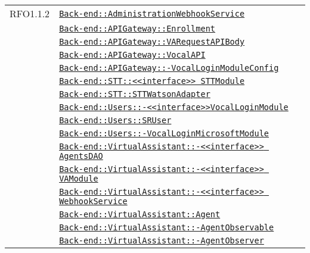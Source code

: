 \begin{longtable}{|>{\centering}m{3cm}|m{10cm}<{\centering}|}
RFO1.1.2 & \hyperref[Back-end::AdministrationWebhookService]{\texttt{Back-end::AdministrationWebhookService}}\\
& \hyperref[Back-end::APIGateway::Enrollment]{\texttt{Back-end::APIGateway::Enrollment}}\\
& \hyperref[Back-end::APIGateway::VARequestAPIBody]{\texttt{Back-end::APIGateway::VARequestAPIBody}}\\
& \hyperref[Back-end::APIGateway::VocalAPI]{\texttt{Back-end::APIGateway::VocalAPI}}\\
& \hyperref[Back-end::APIGateway::VocalLoginModuleConfig]{\texttt{Back-end::APIGateway::-\linebreak VocalLoginModuleConfig}}\\
& \hyperref[Back-end::STT::<<interface>> STTModule]{\texttt{Back-end::STT::<<interface>> STTModule}}\\
& \hyperref[Back-end::STT::STTWatsonAdapter]{\texttt{Back-end::STT::STTWatsonAdapter}}\\
& \hyperref[Back-end::Users::<<interface>>VocalLoginModule]{\texttt{Back-end::Users::-\linebreak <<interface>>VocalLoginModule}}\\
& \hyperref[Back-end::Users::SRUser]{\texttt{Back-end::Users::SRUser}}\\
& \hyperref[Back-end::Users::VocalLoginMicrosoftModule]{\texttt{Back-end::Users::-\linebreak VocalLoginMicrosoftModule}}\\
& \hyperref[Back-end::VirtualAssistant::<<interface>> AgentsDAO]{\texttt{Back-end::VirtualAssistant::-\linebreak <<interface>> AgentsDAO}}\\
& \hyperref[Back-end::VirtualAssistant::<<interface>> VAModule]{\texttt{Back-end::VirtualAssistant::-\linebreak <<interface>> VAModule}}\\
& \hyperref[Back-end::VirtualAssistant::<<interface>> WebhookService]{\texttt{Back-end::VirtualAssistant::-\linebreak <<interface>> WebhookService}}\\
& \hyperref[Back-end::VirtualAssistant::Agent]{\texttt{Back-end::VirtualAssistant::Agent}}\\
& \hyperref[Back-end::VirtualAssistant::AgentObservable]{\texttt{Back-end::VirtualAssistant::-\linebreak AgentObservable}}\\
& \hyperref[Back-end::VirtualAssistant::AgentObserver]{\texttt{Back-end::VirtualAssistant::-\linebreak AgentObserver}}\\

\end{longtable}
